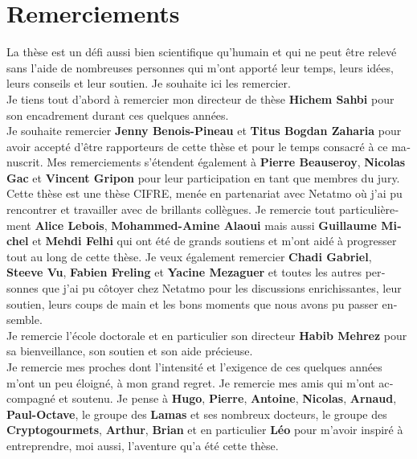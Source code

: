 \chapter*{Remerciements}
\begin{otherlanguage}{french}


\indent La thèse est un défi aussi bien scientifique qu'humain et qui ne peut
être relevé sans l'aide de nombreuses personnes qui m'ont apporté leur temps,
leurs idées, leurs conseils et leur soutien. Je souhaite ici les remercier.\\

Je tiens tout d'abord à remercier mon directeur de thèse \textbf{Hichem Sahbi}
pour son encadrement durant ces quelques années.\\

Je souhaite remercier \textbf{Jenny Benois-Pineau} et \textbf{Titus Bogdan
Zaharia} pour avoir accepté d'être rapporteurs de cette thèse et pour le temps
consacré à ce manuscrit. Mes remerciements s'étendent également à \textbf{Pierre
Beauseroy}, \textbf{Nicolas Gac} et \textbf{Vincent Gripon} pour leur
participation en tant que membres du jury.\\

Cette thèse est une thèse CIFRE, menée en partenariat avec Netatmo où j'ai pu
rencontrer et travailler avec de brillants collègues. Je remercie tout
particulièrement \textbf{Alice Lebois}, \textbf{Mohammed-Amine Alaoui} mais
aussi \textbf{Guillaume Michel} et \textbf{Mehdi Felhi} qui ont été de grands
soutiens et m'ont aidé à progresser tout au long de cette thèse. Je veux
également remercier \textbf{Chadi Gabriel}, \textbf{Steeve Vu}, \textbf{Fabien
Freling} et \textbf{Yacine \mbox{Mezaguer}} et toutes les autres personnes que
j'ai pu côtoyer chez Netatmo pour les discussions enrichissantes, leur soutien,
leurs coups de main et les bons moments que nous avons pu passer ensemble.\\

Je remercie l'école doctorale et en particulier son directeur \textbf{Habib
Mehrez} pour sa bienveillance, son soutien et son aide précieuse.\\

Je remercie mes proches dont l'intensité et l'exigence de ces quelques années
m'ont un peu éloigné, à mon grand regret. Je remercie mes amis qui m'ont
accompagné et soutenu. Je pense à \textbf{Hugo}, \textbf{Pierre},
\textbf{Antoine}, \textbf{Nicolas}, \textbf{Arnaud}, \textbf{Paul-Octave}, le
groupe des \textbf{Lamas} et ses nombreux docteurs, le groupe des
\textbf{Cryptogourmets}, \textbf{Arthur}, \textbf{Brian} et en particulier
\textbf{Léo} pour m'avoir inspiré à entreprendre, moi aussi, l'aventure qu'a été
cette thèse.\\


\end{otherlanguage}
